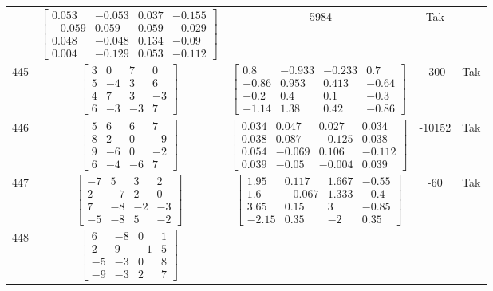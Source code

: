 \documentclass[a4paper,12pt]{article}
\begin{document}
\begin{tabular}{c c c c c}
&
$\begin{bmatrix} 0.053 & -0.053 & 0.037 & -0.155 \\ -0.059 & 0.059 & 0.059 & -0.029 \\ 0.048 & -0.048 & 0.134 & -0.09 \\ 0.004 & -0.129 & 0.053 & -0.112 \end{bmatrix}$
&
-5984
&
Tak
\\
445
&
$\begin{bmatrix} 3 & 0 & 7 & 0 \\ 5 & -4 & 3 & 6 \\ 4 & 7 & 3 & -3 \\ 6 & -3 & -3 & 7 \end{bmatrix}$
&
$\begin{bmatrix} 0.8 & -0.933 & -0.233 & 0.7 \\ -0.86 & 0.953 & 0.413 & -0.64 \\ -0.2 & 0.4 & 0.1 & -0.3 \\ -1.14 & 1.38 & 0.42 & -0.86 \end{bmatrix}$
&
-300
&
Tak
\\
446
&
$\begin{bmatrix} 5 & 6 & 6 & 7 \\ 8 & 2 & 0 & -9 \\ 9 & -6 & 0 & -2 \\ 6 & -4 & -6 & 7 \end{bmatrix}$
&
$\begin{bmatrix} 0.034 & 0.047 & 0.027 & 0.034 \\ 0.038 & 0.087 & -0.125 & 0.038 \\ 0.054 & -0.069 & 0.106 & -0.112 \\ 0.039 & -0.05 & -0.004 & 0.039 \end{bmatrix}$
&
-10152
&
Tak
\\
447
&
$\begin{bmatrix} -7 & 5 & 3 & 2 \\ 2 & -7 & 2 & 0 \\ 7 & -8 & -2 & -3 \\ -5 & -8 & 5 & -2 \end{bmatrix}$
&
$\begin{bmatrix} 1.95 & 0.117 & 1.667 & -0.55 \\ 1.6 & -0.067 & 1.333 & -0.4 \\ 3.65 & 0.15 & 3 & -0.85 \\ -2.15 & 0.35 & -2 & 0.35 \end{bmatrix}$
&
-60
&
Tak
\\
448
&
$\begin{bmatrix} 6 & -8 & 0 & 1 \\ 2 & 9 & -1 & 5 \\ -5 & -3 & 0 & 8 \\ -9 & -3 & 2 & 7 \end{bmatrix}$

\end{tabular}
\end{document}
